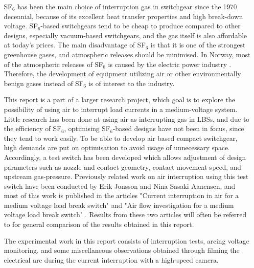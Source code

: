 \documentclass[10pt,b5paper,twoside]{article}
\begin{document}
SF$_6$ has been the main choice of interruption gas in switchgear since the 1970 decennial, because of its excellent heat transfer properties and high break-down voltage. SF$_6$-based switchgears tend to be cheap to produce compared to other designs, especially vacuum-based switchgears, and the gas itself is also affordable at today's prices. The main disadvantage of SF$_6$ is that it is one of the strongest greenhouse gases, and atmospheric releases should be minimised. In Norway, most of the atmospheric releases of SF$_6$ is caused by the electric power industry \cite{bib:StatSF6}. Therefore, the development of equipment utilizing air or other environmentally benign gases instead of SF$_6$ is of interest to the industry.

This report is a part of a larger research project, which goal is to explore the possibility of using air to interrupt load currents in a medium-voltage system. Little research has been done at using air as interrupting gas in LBSs, and due to the efficiency of SF$_6$, optimising SF$_6$-based designs have not been in focus, since they tend to work easily. To be able to develop air based compact switchgear, high demands are put on optimisation to avoid usage of unnecessary space. Accordingly, a test switch has been developed which allows adjustment of design parameters such as nozzle and contact geometry, contact movement speed, and upstream gas-pressure. Previously related work on air interruption using this test switch have been conducted by Erik Jonsson and Nina Sasaki Aanensen, and most of this work is published in the articles "Current interruption in air for a medium voltage load break switch" \cite{bib:CIAMVLBS} and "Air flow investigation for a medium voltage load break switch" \cite{bib:AFIMVLBA}. Results from these two articles will often be referred to for general comparison of the results obtained in this report.

The experimental work in this report consists of interruption tests, arcing voltage monitoring, and some miscellaneous observations obtained through filming the electrical arc during the current interruption with a high-speed camera.
\end{document}
